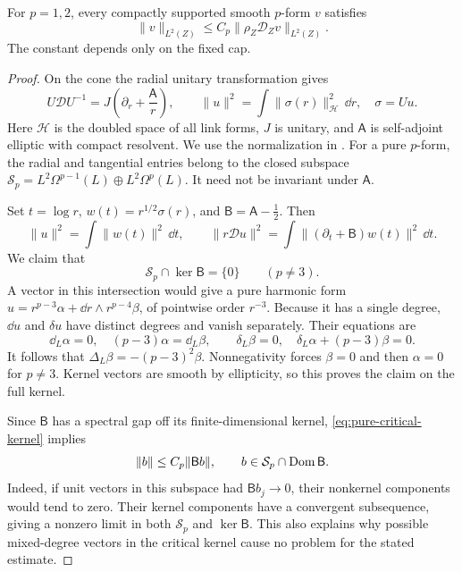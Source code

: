 \begin{proposition}\label{prop:weighted-cap}
For $p=1,2$, every compactly supported smooth $p$-form $v$ satisfies
\begin{equation}\label{eq:weighted-cap}
 \|v\|_{L^2(Z)}\le C_p\|\rho_Z\mathcal D_Zv\|_{L^2(Z)}.
\end{equation}
The constant depends only on the fixed cap.
\end{proposition}
\begin{proof}
On the cone the radial unitary transformation gives
\begin{equation}\label{eq:radial-gauss-bonnet}
 U\mathcal D U^{-1}
       =J\left(\partial_r+\frac{\mathsf A}{r}\right),
 \qquad
 \|u\|^2=\int\|\sigma(r)\|_{\mathcal H}^2\,\dd r,
 \quad \sigma=Uu.
\end{equation}
Here $\mathcal H$ is the doubled space of all link forms, $J$ is
unitary, and $\mathsf A$ is self-adjoint elliptic with compact
resolvent. We use the normalization in
\cite[Section~2.2, p.~1028]{anne-takahashi}. For a pure $p$-form,
the radial and tangential entries belong to the closed subspace
$\mathcal S_p=L^2\Omega^{p-1}(L)\oplus L^2\Omega^p(L)$.
It need not be invariant under $\mathsf A$.

Set $t=\log r$, $w(t)=r^{1/2}\sigma(r)$, and
$\mathsf B=\mathsf A-\frac12$. Then
\begin{equation}\label{eq:log-radial-norms}
 \|u\|^2=\int\|w(t)\|^2\,\dd t,\qquad
 \|r\mathcal Du\|^2
       =\int\|(\partial_t+\mathsf B)w(t)\|^2\,\dd t.
\end{equation}
We claim that
\begin{equation}\label{eq:pure-critical-kernel}
 \mathcal S_p\cap\ker\mathsf B=\{0\}\qquad(p\ne3).
\end{equation}
A vector in this intersection would give a pure harmonic form
$u=r^{p-3}\alpha+\dd r\wedge r^{p-4}\beta$, of pointwise order
$r^{-3}$. Because it has a single degree, $\dd u$ and
$\delta u$ have distinct degrees and vanish separately. Their
equations are
\[
 \dd_L\alpha=0,\quad (p-3)\alpha=\dd_L\beta,\qquad
 \delta_L\beta=0,\quad \delta_L\alpha+(p-3)\beta=0.
\]
It follows that $\Delta_L\beta=-(p-3)^2\beta$. Nonnegativity
forces $\beta=0$ and then $\alpha=0$ for $p\ne3$. Kernel vectors
are smooth by ellipticity, so this proves the claim on the full
kernel.

Since $\mathsf B$ has a spectral gap off its finite-dimensional
kernel, \eqref{eq:pure-critical-kernel} implies
\begin{equation}\label{eq:pure-tangential-coercivity}
 \|b\|\le C_p\|\mathsf Bb\|,\qquad
 b\in\mathcal S_p\cap\operatorname{Dom}\mathsf B.
\end{equation}
Indeed, if unit vectors in this subspace had $\mathsf Bb_j\to0$,
their nonkernel components would tend to zero. Their kernel
components have a convergent subsequence, giving a nonzero limit
in both $\mathcal S_p$ and $\ker\mathsf B$. This also explains why
possible mixed-degree vectors in the critical kernel cause no
problem for the stated estimate.


\end{proof}
